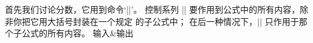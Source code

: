 首先我们讨论分数，它用到命令`|\over|'。%
控制系列 |\over| 要作用到公式中的所有内容，除非你把它用大括号封装在一个规定%
的子公式中；
在后一种情况下，|\over| 只作用于那个子公式的所有内容。
\begindisplaymathdemo
{输入}&{\hbox{输出}}\cr
\noalign{\vskip-3pt}
